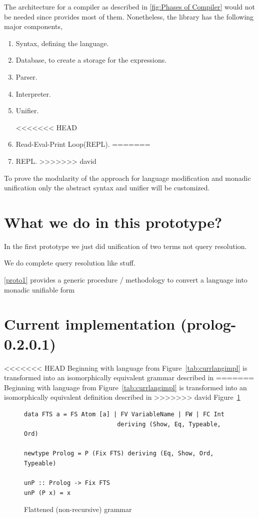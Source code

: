 \documentclass[thesis-solanki.tex]{subfiles}
\begin{document}
The architecture for a compiler as described in \ref{fig:Phases of Compiler} would not be needed since  provides most of
them. Nonetheless, the library has the following major components,

\begin{enumerate}
\item Syntax, defining the language.

\item Database, to create a storage for the expressions.

\item Parser.

\item Interpreter.

\item Unifier.

<<<<<<< HEAD
\item Read-Eval-Print Loop(REPL). 
=======
\item REPL.
>>>>>>> david
\end{enumerate}

To prove the modularity of the approach for language modification and monadic unification only the abstract syntax and unifier will be
customized.


\clearpage
\section{What we do in this prototype?}
In the first prototype we just did unification of two terms not query resolution.

We do complete  query resolution like stuff.

\ref{proto1} provides a generic procedure / methodology to convert a language into monadic unifiable form

\clearpage
\section{Current implementation (prolog-0.2.0.1)}

<<<<<<< HEAD
Beginning with language from Figure~\ref{tab:currlangimpl} is transformed into an isomorphically equivalent grammar described in 
=======
Beginning with language from Figure~\ref{tab:currlangimpl} is transformed into an isomorphically equivalent definition described in
>>>>>>> david
Figure~\ref{tab:flatgrp0201}

\begin{figure}[h]
\begin{verbatim}
data FTS a = FS Atom [a] | FV VariableName | FW | FC Int
                          deriving (Show, Eq, Typeable, Ord)

newtype Prolog = P (Fix FTS) deriving (Eq, Show, Ord, Typeable)

unP :: Prolog -> Fix FTS
unP (P x) = x
\end{verbatim}
\caption{Flattened (non-recursive) grammar}
\label{tab:flatgrp0201}
\end{figure}
\end{document}
